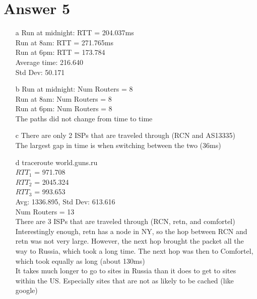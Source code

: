 \documentclass[11pt]{article}
\theoremstyle{definition}
\begin{document}
\section*{Answer 5}
\begin{enumerate}
	traceroute reddit.com\\
	\item[a]
	Run at midnight: RTT = 204.037ms\\
	Run at 8am: RTT = 271.765ms\\
	Run at 6pm: RTT = 173.784\\

	Average time: 216.640\\
	Std Dev: 50.171\\

	\item[b]
	Run at midnight: Num Routers = 8\\
	Run at 8am: Num Routers = 8\\
	Run at 6pm: Num Routers = 8\\

	The paths did not change from time to time

	\item[c]
	There are only 2 ISPs that are traveled through (RCN and AS13335)\\
	The largest gap in time is when switching between the two (36ms)\\

	\item[d]
	traceroute world.guns.ru\\
	$RTT_1$ = 971.708\\
	$RTT_2$ = 2045.324\\
	$RTT_3$ = 993.653\\
	Avg: 1336.895, Std Dev: 613.616\\
	Num Routers = 13\\
	There are 3 ISPs that are traveled through (RCN, retn, and comfortel)\\
	Interestingly enough, retn has a node in NY, so the hop between RCN and retn was not very large.  However, the next hop brought the packet all the way to Russia, which took a long time.  The next hop was then to Comfortel, which took equally as long (about 130ms)\\
	It takes much longer to go to sites in Russia than it does to get to sites within the US.  Especially sites that are not as likely to be cached (like google)
\end{enumerate}
\end{document}
